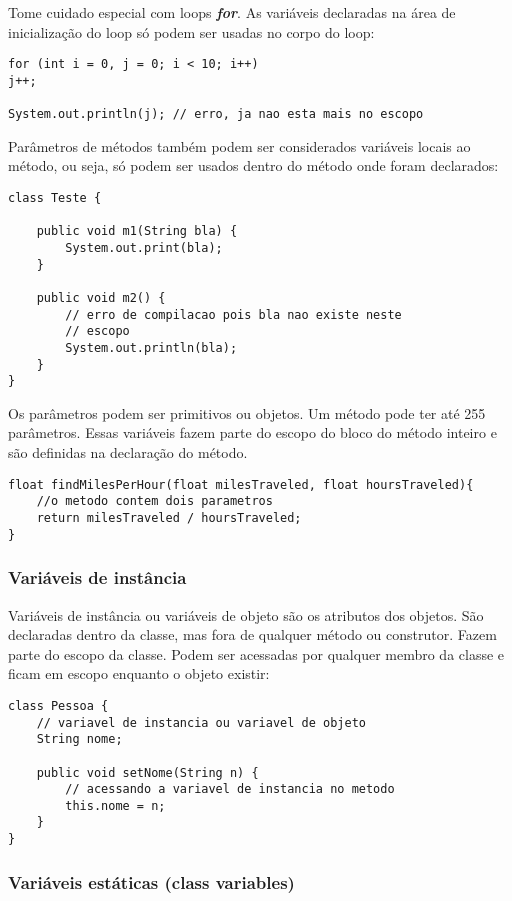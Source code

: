 \documentclass[12pt]{article}
\begin{document}
Tome cuidado especial com loops \textbf{\textit{for}}. As variáveis declaradas na área de inicialização do loop só podem ser usadas no corpo do loop:

\begin{lstlisting}
for (int i = 0, j = 0; i < 10; i++)
j++;

System.out.println(j); // erro, ja nao esta mais no escopo
\end{lstlisting}

Parâmetros de métodos também podem ser considerados variáveis locais ao método, ou seja, só podem ser usados dentro do método onde foram declarados:

\begin{lstlisting}
class Teste {
	
	public void m1(String bla) {
		System.out.print(bla);
	}
	
	public void m2() {
		// erro de compilacao pois bla nao existe neste
		// escopo
		System.out.println(bla);
	}
}
\end{lstlisting}

Os parâmetros podem ser primitivos ou objetos. Um método pode ter até 255 parâmetros. Essas variáveis fazem parte do escopo do bloco do método inteiro e são definidas na declaração do método.
\begin{lstlisting}
float findMilesPerHour(float milesTraveled, float hoursTraveled){
	//o metodo contem dois parametros
	return milesTraveled / hoursTraveled;
}
\end{lstlisting}

\subsubsection{Variáveis de instância}

Variáveis de instância ou variáveis de objeto são os atributos dos objetos. São declaradas dentro da classe, mas fora de qualquer método ou construtor. Fazem parte do escopo da classe. Podem ser acessadas por qualquer membro da classe e ficam em escopo enquanto o objeto existir:

\begin{lstlisting}
class Pessoa {
	// variavel de instancia ou variavel de objeto
	String nome;
	
	public void setNome(String n) {
		// acessando a variavel de instancia no metodo
		this.nome = n;
	}
}
\end{lstlisting}

\subsubsection{Variáveis estáticas (class variables)}
\end{document}
